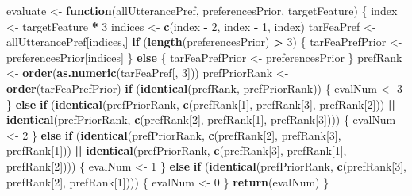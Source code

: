 \documentclass[]{article}
\newenvironment{Shaded}{\begin{snugshade}}{\end{snugshade}}
\newcommand{\ControlFlowTok}[1]{\textcolor[rgb]{0.13,0.29,0.53}{\textbf{#1}}}
\newcommand{\DecValTok}[1]{\textcolor[rgb]{0.00,0.00,0.81}{#1}}
\newcommand{\KeywordTok}[1]{\textcolor[rgb]{0.13,0.29,0.53}{\textbf{#1}}}
\newcommand{\NormalTok}[1]{#1}
\newcommand{\OperatorTok}[1]{\textcolor[rgb]{0.81,0.36,0.00}{\textbf{#1}}}
\newcommand{\StringTok}[1]{\textcolor[rgb]{0.31,0.60,0.02}{#1}}
\begin{document}
\begin{Shaded}
\begin{Highlighting}[]
\NormalTok{evaluate <-}
\StringTok{  }\ControlFlowTok{function}\NormalTok{(allUtterancePref,}
\NormalTok{           preferencesPrior,}
\NormalTok{           targetFeature) \{}
\NormalTok{    index <-}\StringTok{ }\NormalTok{targetFeature }\OperatorTok{*}\StringTok{ }\DecValTok{3}
\NormalTok{    indices <-}\StringTok{ }\KeywordTok{c}\NormalTok{(index }\OperatorTok{-}\StringTok{ }\DecValTok{2}\NormalTok{, index }\OperatorTok{-}\StringTok{ }\DecValTok{1}\NormalTok{, index)}
\NormalTok{    tarFeaPref <-}\StringTok{ }\NormalTok{allUtterancePref[indices,]}
    \ControlFlowTok{if}\NormalTok{ (}\KeywordTok{length}\NormalTok{(preferencesPrior) }\OperatorTok{>}\StringTok{ }\DecValTok{3}\NormalTok{) \{}
\NormalTok{      tarFeaPrefPrior <-}\StringTok{ }\NormalTok{preferencesPrior[indices]}
\NormalTok{    \} }\ControlFlowTok{else}\NormalTok{ \{}
\NormalTok{      tarFeaPrefPrior <-}\StringTok{ }\NormalTok{preferencesPrior}
\NormalTok{    \}}
\NormalTok{    prefRank <-}
\StringTok{      }\KeywordTok{order}\NormalTok{(}\KeywordTok{as.numeric}\NormalTok{(tarFeaPref[, }\DecValTok{3}\NormalTok{]))}
\NormalTok{    prefPriorRank <-}
\StringTok{      }\KeywordTok{order}\NormalTok{(tarFeaPrefPrior)}
    \ControlFlowTok{if}\NormalTok{ (}\KeywordTok{identical}\NormalTok{(prefRank, prefPriorRank)) \{}
\NormalTok{      evalNum <-}\StringTok{ }\DecValTok{3}
\NormalTok{    \} }\ControlFlowTok{else} \ControlFlowTok{if}\NormalTok{ (}\KeywordTok{identical}\NormalTok{(prefPriorRank, }\KeywordTok{c}\NormalTok{(prefRank[}\DecValTok{1}\NormalTok{], prefRank[}\DecValTok{3}\NormalTok{], prefRank[}\DecValTok{2}\NormalTok{])) }\OperatorTok{||}
\StringTok{               }\KeywordTok{identical}\NormalTok{(prefPriorRank, }\KeywordTok{c}\NormalTok{(prefRank[}\DecValTok{2}\NormalTok{], prefRank[}\DecValTok{1}\NormalTok{], prefRank[}\DecValTok{3}\NormalTok{]))) \{}
\NormalTok{      evalNum <-}\StringTok{ }\DecValTok{2}
\NormalTok{    \} }\ControlFlowTok{else} \ControlFlowTok{if}\NormalTok{ (}\KeywordTok{identical}\NormalTok{(prefPriorRank, }\KeywordTok{c}\NormalTok{(prefRank[}\DecValTok{2}\NormalTok{], prefRank[}\DecValTok{3}\NormalTok{], prefRank[}\DecValTok{1}\NormalTok{])) }\OperatorTok{||}
\StringTok{               }\KeywordTok{identical}\NormalTok{(prefPriorRank, }\KeywordTok{c}\NormalTok{(prefRank[}\DecValTok{3}\NormalTok{], prefRank[}\DecValTok{1}\NormalTok{], prefRank[}\DecValTok{2}\NormalTok{]))) \{}
\NormalTok{      evalNum <-}\StringTok{ }\DecValTok{1}
\NormalTok{    \} }\ControlFlowTok{else} \ControlFlowTok{if}\NormalTok{ (}\KeywordTok{identical}\NormalTok{(prefPriorRank, }\KeywordTok{c}\NormalTok{(prefRank[}\DecValTok{3}\NormalTok{], prefRank[}\DecValTok{2}\NormalTok{], prefRank[}\DecValTok{1}\NormalTok{]))) \{}
\NormalTok{      evalNum <-}\StringTok{ }\DecValTok{0}
\NormalTok{    \}}
    \KeywordTok{return}\NormalTok{(evalNum)}
\NormalTok{  \}}
\end{Highlighting}
\end{Shaded}
\end{document}
